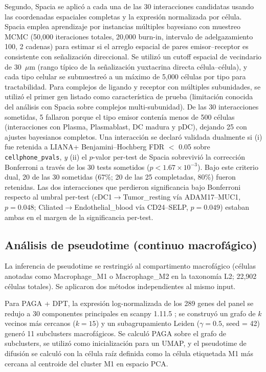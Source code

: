 \documentclass[12pt,a4paper]{article}
\begin{document}
Segundo, Spacia \citep{zhu2024spacia} se aplicó a cada una de las 30 interacciones candidatas usando las coordenadas espaciales completas y la expresión normalizada por célula. Spacia emplea aprendizaje por instancias múltiples bayesiano con muestreo MCMC (50,000 iteraciones totales, 20,000 burn-in, intervalo de adelgazamiento 100, 2 cadenas) para estimar si el arreglo espacial de pares emisor--receptor es consistente con señalización direccional. Se utilizó un cutoff espacial de vecindario de 30~$\mu$m (rango típico de la señalización yuxtacrina directa célula--célula), y cada tipo celular se submuestreó a un máximo de 5,000 células por tipo para tractabilidad. Para complejos de ligando y receptor con múltiples subunidades, se utilizó el primer gen listado como característica de prueba (limitación conocida del análisis con Spacia sobre complejos multi-subunidad). De las 30 interacciones sometidas, 5 fallaron porque el tipo emisor contenía menos de 500 células (interacciones con Plasma, Plasmablast, DC madura y pDC), dejando 25 con ajustes bayesianos completos. Una interacción se declaró validada dualmente si (i) fue retenida a LIANA+ Benjamini--Hochberg FDR $<$ 0.05 sobre \texttt{cellphone\_pvals}, \emph{y} (ii) el $p$-valor per-test de Spacia sobrevivió la corrección Bonferroni a través de los 30 tests sometidos ($p < 1.67 \times 10^{-3}$). Bajo este criterio dual, 20 de las 30 sometidas (67\%; 20 de las 25 completadas, 80\%) fueron retenidas. Las dos interacciones que perdieron significancia bajo Bonferroni respecto al umbral per-test (cDC1$\to$Tumor\_resting vía ADAM17--MUC1, $p=0.048$; Ciliated$\to$Endothelial\_blood vía CD24--SELP, $p=0.049$) estaban ambas en el margen de la significancia per-test.

\subsection*{Análisis de pseudotime (continuo macrofágico)}
La inferencia de pseudotime se restringió al compartimento macrofágico (células anotadas como Macrophage\_M1 o Macrophage\_M2 en la taxonomía L2; 22,902 células totales). Se aplicaron dos métodos independientes al mismo input.

Para PAGA + DPT, la expresión log-normalizada de los 289 genes del panel se redujo a 30 componentes principales en scanpy 1.11.5 \citep{wolf2018scanpy}; se construyó un grafo de $k$ vecinos más cercanos ($k = 15$) y un subagrupamiento Leiden ($\gamma = 0.5$, seed = 42) generó 11 subclusters macrofágicos. Se calculó PAGA \citep{wolf2019paga} sobre el grafo de subclusters, se utilizó como inicialización para un UMAP, y el pseudotime de difusión \citep{haghverdi2016dpt} se calculó con la célula raíz definida como la célula etiquetada M1 más cercana al centroide del cluster M1 en espacio PCA.
\end{document}
